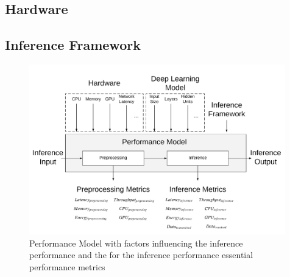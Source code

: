 \subsection{Hardware}
\subsection{Inference Framework}

\begin{figure}[!htb]
\centering
\includegraphics[width=0.99\textwidth]{./Bilder/PerformanceModel.png}
\caption{Performance Model with factors influencing the inference performance and the for the inference performance essential performance metrics}
\label{fig:perfmodel}
\end{figure}



